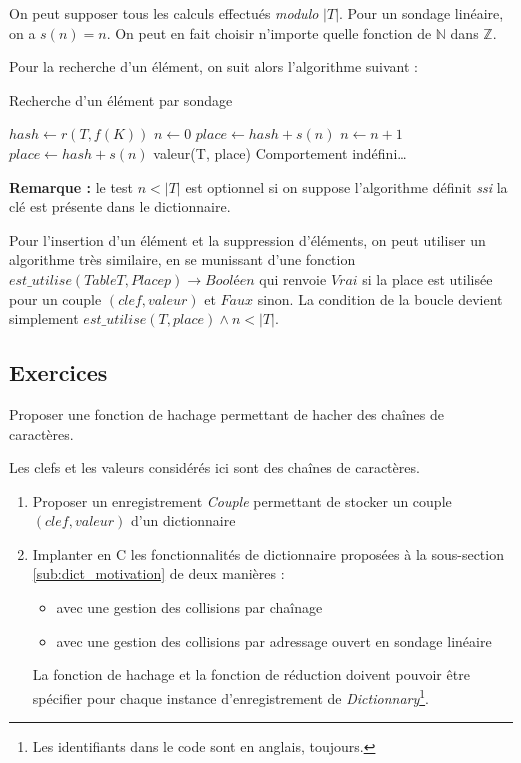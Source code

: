 \documentclass[../../../main.tex]{subfiles}
\begin{document}
On peut supposer tous les calculs effectués \textit{modulo} $|T|$. Pour un sondage linéaire, on a $s(n) = n$. On peut en fait choisir n'importe quelle fonction de $\mathbb{N}$ dans $\mathbb{Z}$.

Pour la recherche d'un élément, on suit alors l'algorithme suivant :\newline

\begin{algorithm}
\caption{Recherche d'un élément par sondage}\label{alg:dict_sondage}
$hash \leftarrow r(T, f(K))$\;
$n \leftarrow 0$\;
$place \leftarrow hash + s(n)$\;
 {
	$n\leftarrow n + 1$\;
	$place\leftarrow hash + s(n)$\;
}
 {
	\Return valeur(T, place)\;
} {
	Comportement indéfini\dots {}
}
\end{algorithm}

\textbf{Remarque :} le test $n < |T|$ est optionnel si on suppose l'algorithme définit \textit{ssi} la clé est présente dans le dictionnaire.

Pour l'insertion d'un élément et la suppression d'éléments, on peut utiliser un algorithme très similaire, en se munissant d'une fonction $est\_utilise(Table T, Place p)\rightarrow \textit{Booléen}$ qui renvoie $Vrai$ si la place est utilisée pour un couple $(clef, valeur)$ et $Faux$ sinon. La condition de la boucle devient simplement $est\_utilise(T, place) \wedge n < |T|$.
\subsection{Exercices}
Proposer une fonction de hachage permettant de hacher des chaînes de caractères.

Les clefs et les valeurs considérés ici sont des chaînes de caractères.
\begin{enumerate}
	\item Proposer un enregistrement \textit{Couple} permettant de stocker un couple $(clef, valeur)$ d'un dictionnaire
	\item Implanter en C les fonctionnalités de dictionnaire proposées à la sous-section \ref{sub:dict_motivation} de deux manières :
		\begin{itemize}
			\item avec une gestion des collisions par chaînage
			\item avec une gestion des collisions par adressage ouvert en sondage linéaire
		\end{itemize}
		La fonction de hachage et la fonction de réduction doivent pouvoir être spécifier pour chaque instance d'enregistrement de \textit{Dictionnary}\footnote{Les identifiants dans le code sont en anglais, toujours.}.
\end{enumerate}
\end{document}
